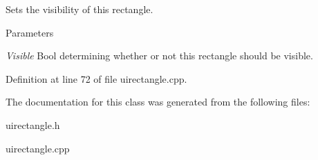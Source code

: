 Sets the visibility of this rectangle. 


\begin{DoxyParams}{Parameters}
\item[{\em Visible}]Bool determining whether or not this rectangle should be visible. \end{DoxyParams}


Definition at line 72 of file uirectangle.cpp.



The documentation for this class was generated from the following files:\begin{DoxyCompactItemize}
\item 
uirectangle.h\item 
uirectangle.cpp\end{DoxyCompactItemize}
